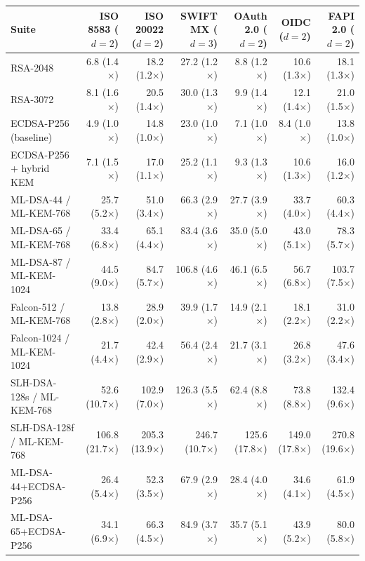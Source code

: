 \begin{tabular}{@{}lrrrrrr@{}}
\toprule
Suite & ISO 8583 ($d{=}2$) & ISO 20022 ($d{=}2$) & SWIFT MX ($d{=}3$) & OAuth 2.0 ($d{=}2$) & OIDC ($d{=}2$) & FAPI 2.0 ($d{=}2$) \\
\midrule
RSA-2048 & 6.8 (1.4$\times$) & 18.2 (1.2$\times$) & 27.2 (1.2$\times$) & 8.8 (1.2$\times$) & 10.6 (1.3$\times$) & 18.1 (1.3$\times$) \\
RSA-3072 & 8.1 (1.6$\times$) & 20.5 (1.4$\times$) & 30.0 (1.3$\times$) & 9.9 (1.4$\times$) & 12.1 (1.4$\times$) & 21.0 (1.5$\times$) \\
ECDSA-P256 (baseline) & 4.9 (1.0$\times$) & 14.8 (1.0$\times$) & 23.0 (1.0$\times$) & 7.1 (1.0$\times$) & 8.4 (1.0$\times$) & 13.8 (1.0$\times$) \\
ECDSA-P256 + hybrid KEM & 7.1 (1.5$\times$) & 17.0 (1.1$\times$) & 25.2 (1.1$\times$) & 9.3 (1.3$\times$) & 10.6 (1.3$\times$) & 16.0 (1.2$\times$) \\
ML-DSA-44 / ML-KEM-768 & 25.7 (5.2$\times$) & 51.0 (3.4$\times$) & 66.3 (2.9$\times$) & 27.7 (3.9$\times$) & 33.7 (4.0$\times$) & 60.3 (4.4$\times$) \\
ML-DSA-65 / ML-KEM-768 & 33.4 (6.8$\times$) & 65.1 (4.4$\times$) & 83.4 (3.6$\times$) & 35.0 (5.0$\times$) & 43.0 (5.1$\times$) & 78.3 (5.7$\times$) \\
ML-DSA-87 / ML-KEM-1024 & 44.5 (9.0$\times$) & 84.7 (5.7$\times$) & 106.8 (4.6$\times$) & 46.1 (6.5$\times$) & 56.7 (6.8$\times$) & 103.7 (7.5$\times$) \\
Falcon-512 / ML-KEM-768 & 13.8 (2.8$\times$) & 28.9 (2.0$\times$) & 39.9 (1.7$\times$) & 14.9 (2.1$\times$) & 18.1 (2.2$\times$) & 31.0 (2.2$\times$) \\
Falcon-1024 / ML-KEM-1024 & 21.7 (4.4$\times$) & 42.4 (2.9$\times$) & 56.4 (2.4$\times$) & 21.7 (3.1$\times$) & 26.8 (3.2$\times$) & 47.6 (3.4$\times$) \\
SLH-DSA-128s / ML-KEM-768 & 52.6 (10.7$\times$) & 102.9 (7.0$\times$) & 126.3 (5.5$\times$) & 62.4 (8.8$\times$) & 73.8 (8.8$\times$) & 132.4 (9.6$\times$) \\
SLH-DSA-128f / ML-KEM-768 & 106.8 (21.7$\times$) & 205.3 (13.9$\times$) & 246.7 (10.7$\times$) & 125.6 (17.8$\times$) & 149.0 (17.8$\times$) & 270.8 (19.6$\times$) \\
ML-DSA-44+ECDSA-P256 & 26.4 (5.4$\times$) & 52.3 (3.5$\times$) & 67.9 (2.9$\times$) & 28.4 (4.0$\times$) & 34.6 (4.1$\times$) & 61.9 (4.5$\times$) \\
ML-DSA-65+ECDSA-P256 & 34.1 (6.9$\times$) & 66.3 (4.5$\times$) & 84.9 (3.7$\times$) & 35.7 (5.1$\times$) & 43.9 (5.2$\times$) & 80.0 (5.8$\times$) \\
\bottomrule
\end{tabular}

